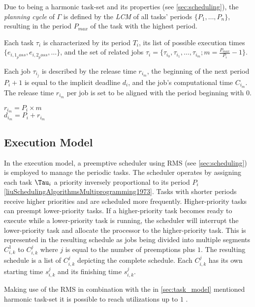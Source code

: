 Due to being a harmonic task-set and its properties (see \cref{sec:scheduling}), the \textit{planning cycle}\cite{dar-tzenpengAssignmentSchedulingCommunicating1997} of $\Gamma$ is defined by the \textit{\ac{LCM}} of all tasks' periods $\{P_1, \ldots, P_n\}$, resulting in the period $P_{max}$ of the task with the highest period. 

Each task $\tau_i$ is characterized by its period $T_i$, its list of possible execution times $\{e_{{i,1}_poss}, e_{{i,2}_poss}, \ldots\}$, and the set of related jobs $\tau_i=\{\tau_{i_0}, \tau_{i_1}, \dots, \tau_{i_m}; m = \frac{P_{max}}{P_i} - 1\}$.

Each job $\tau_{i_j}$ is described by the release time $r_{i_m}$, the beginning of the next period $P_i+1$ is equal to the implicit deadline $d_i$, and the job's computational time $C_{i_m}$. The release time $r_{i_m}$ per job is set to be aligned with the period beginning with $0$.
\begin{center}
    $r_{i_m} = P_i \times m$ \\
    $d_{i_m} = P_i + r_{i_m}$
\end{center}

\subsection{Execution Model}\label{sec:execution_model}
In the execution model, a preemptive scheduler using \ac{RMS} (see \cref{sec:scheduling}) is employed to manage the periodic tasks. 
The scheduler operates by assigning each task $\Tau_i$ a priority inversely proportional to its period $P_i$ \ref{liuSchedulingAlgorithmsMultiprogramming1973}.
Tasks with shorter periods receive higher priorities and are scheduled more frequently.
Higher-priority tasks can preempt lower-priority tasks.
If a higher-priority task becomes ready to execute while a lower-priority task is running, the scheduler will interrupt the lower-priority task and allocate the processor to the higher-priority task.
This is represented in the resulting schedule as jobs being divided into multiple segments $C_{i,k}^1$ to $C_{i,k}^j$ where $j$ is equal to the number of preemptions plus $1$.
The resulting schedule is a list of $C_{i,k}^j$ depicting the complete schedule.
Each $C_{i,k}^j$ has its own starting time $s_{i,k}^j$ and its finishing time $s_{i,k}^j$.


Making use of the \ac{RMS} in combination with the in \cref{sec:task_model} mentioned harmonic task-set it is possible to reach utilizations up to $1$ \cite{liuSchedulingAlgorithmsMultiprogramming1973}.

